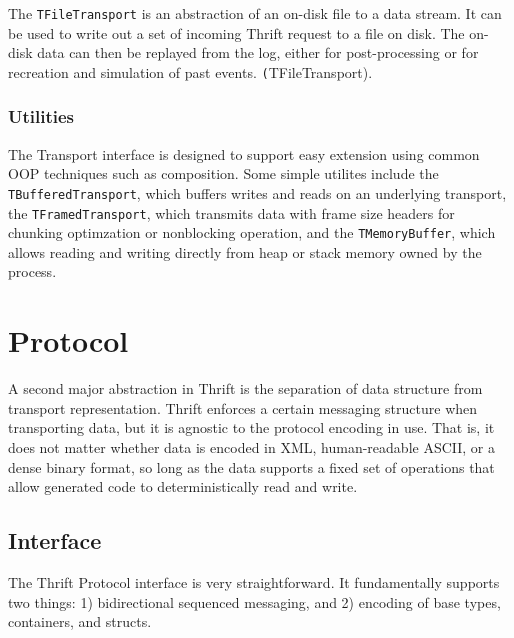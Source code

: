 \documentclass[nocopyrightspace,blockstyle]{sigplanconf}
\begin{document}
The \texttt{TFileTransport} is an abstraction of an on-disk file to a data
stream. It can be used to write out a set of incoming Thrift request to a file
on disk. The on-disk data can then be replayed from the log, either for post-processing
or for recreation and simulation of past events. \texttt(TFileTransport).

\subsubsection{Utilities}

The Transport interface is designed to support easy extension using common
OOP techniques such as composition. Some simple utilites include the
\texttt{TBufferedTransport}, which buffers writes and reads on an underlying
transport, the \texttt{TFramedTransport}, which transmits data with frame
size headers for chunking optimzation or nonblocking operation, and the
\texttt{TMemoryBuffer}, which allows reading and writing directly from heap or
stack memory owned by the process.

\section{Protocol}

A second major abstraction in Thrift is the separation of data structure from
transport representation. Thrift enforces a certain messaging structure when
transporting data, but it is agnostic to the protocol encoding in use. That is,
it does not matter whether data is encoded in XML, human-readable ASCII, or a
dense binary format, so long as the data supports a fixed set of operations
that allow generated code to deterministically read and write.

\subsection{Interface}

The Thrift Protocol interface is very straightforward. It fundamentally
supports two things: 1) bidirectional sequenced messaging, and
2) encoding of base types, containers, and structs.
\end{document}
